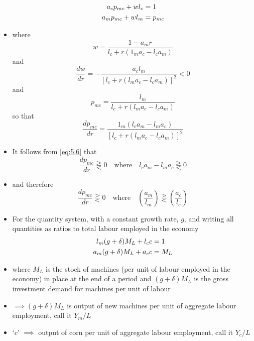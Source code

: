 \documentclass{article}
\begin{document}
\begin{itemize}
\begin{align}
			a_c p_{mc} + w l_c &= 1 \notag \\
			a_m p_{mc} + w l_m &= p_{mc} \label{eq:5.2}
		\end{align}
		\item where
		\begin{equation}
			w = \frac{1 - a_m r}{l_c + r (1_m a_c - l_c a_m)} \label{eq:5.3}
		\end{equation}
		and
		\begin{equation}
			\frac{dw}{dr}  = - \frac{a_c l_m}{[l_c + r(l_m a_c - l_c a_m)]^2} < 0 \label{eq:5.4}
		\end{equation}
		and
		\begin{equation}
			p_{mc} = \frac{l_m}{l_c + r (l_m a_c - l_c a_m)} \label{eq:5.5}
		\end{equation}
		so that
		\begin{equation}
			\frac{dp_{mc}}{dr} = \frac{1_m (l_c a_m - l_m a_c)}{[l_c + r(l_m a_c - l_c a_m)]^2} \label{eq:5.6}
		\end{equation}
		\item It follows from \cref{eq:5.6} that
		\begin{equation}
			\frac{dp_{mc}}{dr} \gtreqless 0 \quad \text{where} \quad l_c a_m - l_m a_c \gtreqless 0 \label{eq:5.7}
		\end{equation}
		\item and therefore
		\begin{equation}
			\frac{dp_{mc}}{dr} \gtreqless 0 \quad \text{where} \quad \left( \frac{a_m}{l_m} \right) \gtreqless \left( \frac{a_c}{l_c} \right) \label{eq:5.8}
		\end{equation}
		\item For the quantity system, with a constant growth rate, \( g \), and writing all quantities as ratios to total labour employed in the economy
		\begin{align}
			l_m (g + \delta) M_L + l_c c &= 1 \notag \\
			a_m (g + \delta) M_L + a_c c &= M_L \label{eq:5.9}
		\end{align}
		\item where \( M_L \) is the stock of machines (per unit of labour employed in the economy) in place at the end of a period and \( (g + \delta) M_L \) is the gross investment demand for machines per unit of labour
		\item \( \implies (g+ \delta) M_L \) is output of new machines per unit of aggregate labour employment, call it \( Y_m / L \) 
		\item `\( c \)' \( \implies \) output of corn per unit of aggregate labour employment, call it \( Y_c / L \) 

\end{itemize}
\end{document}
